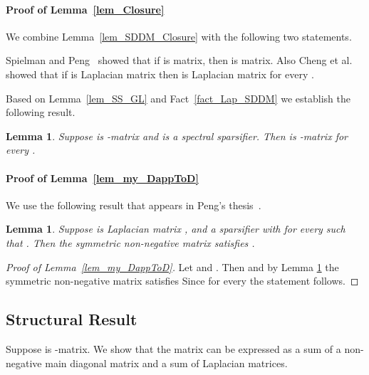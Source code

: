 \documentclass[11pt]{article}
\newtheorem{lem}[thm]{Lemma}
\numberwithin{thm}{section}
\begin{document}
\paragraph*{Proof of Lemma~\ref{lem_Closure}} We combine Lemma~\ref{lem_SDDM_Closure} with the following two statements.

\begin{fact}\label{fact_Lap_SDDM}
Spielman and Peng~\cite[Proposition 5.6]{PS14} showed that if  is  matrix, then  is  matrix. Also Cheng et al.~\cite[Proposition 25]{CCLPT15} showed that if  is Laplacian matrix then  is Laplacian matrix for every .
\end{fact}

Based on Lemma~\ref{lem_SS_GL} and Fact~\ref{fact_Lap_SDDM} we establish the following result.

\begin{lem}\label{lem_Lap_SDDM_Sparsifiers}
Suppose  is -matrix and  is a spectral sparsifier. Then  is -matrix for every .
\end{lem}


\paragraph*{Proof of Lemma~\ref{lem_my_DappToD}} We use the following result that appears in Peng's thesis~\cite{PengPhd13}.


\begin{lem}
\cite{PengPhd13}\label{lem_DA}
Suppose  is Laplacian matrix
, and 
a sparsifier with  for every  such that
.
Then the symmetric non-negative matrix 
satisfies .
\end{lem}


\begin{proof}[Proof of Lemma~\ref{lem_my_DappToD}]
Let 
and . Then 
and by Lemma \ref{lem_DA} the symmetric non-negative matrix 
satisfies 
Since  for every 
the statement follows.
\end{proof}





\subsection{Structural Result}\label{appsubsec:SR}

Suppose  is -matrix. We show that the matrix  can be expressed as a sum of a non-negative main diagonal matrix and a sum of Laplacian matrices.
\end{document}
